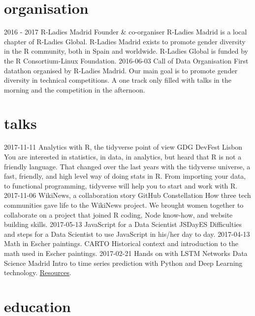 \documentclass[]{friggeri-cv}
\begin{document}
\section{organisation}

\begin{entrylist}
  \entry
    {2016 - 2017}
    {R-Ladies Madrid}
    {Founder \& co-organiser}
    {R-Ladies Madrid is a local chapter of R-Ladies Global. R-Ladies Madrid exists to promote gender diversity in the R community, both in Spain and worldwide. R-Ladies Global is funded by the R Consortium-Linux Foundation.}
  \entry
    {2016-06-03}
    {Call of Data}
    {Organisation}
    {First datathon organised by R-Ladies Madrid. Our main goal is to promote gender diversity in technical competitions. A one track only filled with talks in the morning and the competition in the afternoon.}
\end{entrylist}

\section{talks}

\begin{entrylist}
  \entry
    {2017-11-11}
    {Analytics with R, the tidyverse point of view}
    {GDG DevFest Lisbon}
    {You are interested in statistics, in data, in analytics, but heard that R is not a friendly language. That changed over the last years with the tidyverse universe, a fast, friendly, and high level way of doing stats in R. From importing your data, to functional programming, tidyverse will help you to start and work with R.}
  \entry
    {2017-11-06}
    {WikiNews, a collaboration story}
    {GitHub Constellation}
    {How three tech communities gave life to the WikiNews project. We brought women together to collaborate on a project that joined R coding, Node know-how, and website building skills.}
  \entry
    {2017-05-13}
    {JavaScript for a Data Scientist}
    {JSDayES}
    {Difficulties and steps for a Data Scientist to use JavaScript in his/her day to day.}
  \entry
    {2017-04-13}
    {Math in Escher paintings.}
    {CARTO}
    {Historical context and introduction to the math used in Escher paintings.}
  \entry
    {2017-02-21}
    {Hands on with LSTM Networks}
    {Data Science Madrid}
    {Intro to time series prediction with Python and Deep Learning technology. \href{https://github.com/chucheria/20170221_DSM-Workbook}{Resources}.}
\end{entrylist}

\section{education}
\end{document}
